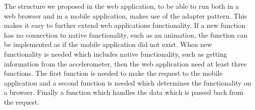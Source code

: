 The structure we proposed in the web application, to be able to run both in a web browser and in a mobile application, makes use of the adapter pattern. This makes it easy to further extend web applications functionality. If a new function has no connection to native functionality, such as an animation, the function can be implemented as if the mobile application did not exist. When new functionality is needed which includes native functionality, such as getting information from the accelerometer, then the web application need at least three functions. The first function is needed to make the request to the mobile application and a second function is needed which determines the functionality on a browser. Finally a function which handles the data which is passed back from the request. 

